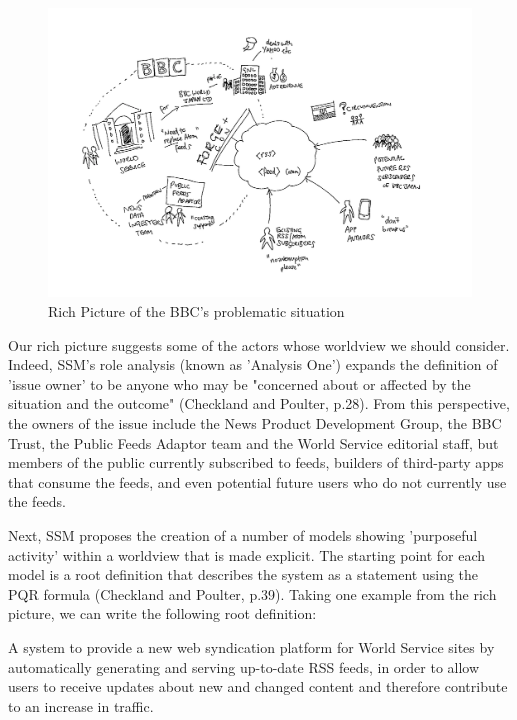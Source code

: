 \documentclass{article}
\begin{document}
\begin{figure}
  \includegraphics[width=\textwidth]{richpicture.png}
  \caption{Rich Picture of the BBC's problematic situation}
  \label{rich-picture}
\end{figure}

Our rich picture suggests some of the actors whose worldview we should consider. Indeed, SSM's role analysis (known as 'Analysis One') expands the definition of 'issue owner' to be anyone who may be "concerned about or affected by the situation and the outcome" (Checkland and Poulter, p.28). From this perspective, the owners of the issue include the News Product Development Group, the BBC Trust, the Public Feeds Adaptor team and the World Service editorial staff, but members of the public currently subscribed to feeds, builders of third-party apps that consume the feeds, and even potential future users who do not currently use the feeds.

Next, SSM proposes the creation of a number of models showing 'purposeful activity' within a worldview that is made explicit. The starting point for each model is a root definition that describes the system as a statement using the PQR formula (Checkland and Poulter, p.39). Taking one example from the rich picture, we can write the following root definition:

\begin{displayquote}
A system to provide a new web syndication platform for World Service sites by automatically generating and serving up-to-date RSS feeds, in order to allow users to receive updates about new and changed content and therefore contribute to an increase in traffic.
\end{displayquote}
\end{document}
